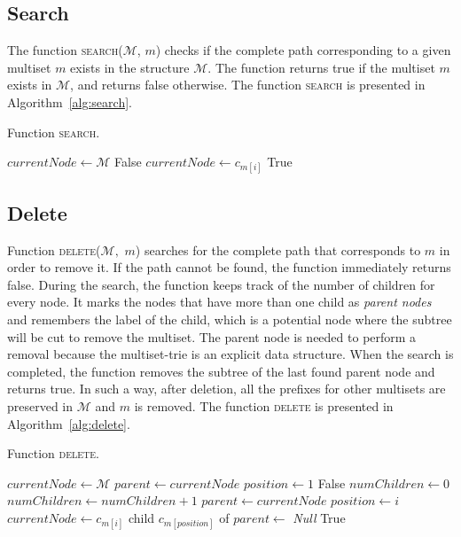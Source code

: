 \documentclass[algorithms,article,accept,pdftex,moreauthors]{Definitions/mdpi}
\begin{document}
\subsection{Search}\label{s:search}
The function \textsc{search}($\mathcal{M}$, $m$) checks if the complete path corresponding to 
a given multiset $m$ exists in the structure $\mathcal{M}.$ The function returns 
true if the multiset $m$ exists in $\mathcal{M}$, and returns false otherwise. The 
function \textsc{search} is presented in Algorithm~\ref{alg:search}.

\begin{algorithm}[H]
\caption{Function \textsc{search}.}
\label{alg:search}
\begin{algorithmic}[1]
\State $currentNode \gets \mathcal{M}$
\State \Return False
\EndIf
\State $currentNode \gets c_{m[i]}$
\EndFor
\State \Return True
\EndFunction
\end{algorithmic}
\end{algorithm}

\subsection{Delete} \label{s:delete}
Function \textsc{delete}($\mathcal{M},$ $m$) searches for the complete path 
that corresponds to $m$ in order to remove it. If the path cannot be found, the 
function immediately returns false. During the search, the function keeps track of the 
number of children for every node. It marks the nodes that have more than one child 
as \emph{parent nodes} and remembers the label of the child, which is a potential node 
where the subtree will be cut to remove the multiset. The parent node is needed to 
perform a removal because the multiset-trie is an explicit data structure. When the search 
is completed, the function removes the subtree of the last found parent node and 
returns true. In such a way, after deletion, all the prefixes for other multisets are 
preserved in $\mathcal{M}$ and $m$ is removed. The function \textsc{delete} is 
presented in Algorithm~\ref{alg:delete}.


\begin{algorithm}[H]
\caption{Function \textsc{delete}.}
\label{alg:delete}
\begin{algorithmic}[1]
\State $currentNode \gets \mathcal{M}$
\State $parent \gets currentNode$ 
\State $position \gets 1$
\State \Return False
\EndIf
\State $numChildren \gets 0$
\State $numChildren\gets numChildren+1$
\EndIf
\EndFor
{}
\State $parent\gets currentNode$
\State $position \gets i$
\EndIf
\State $currentNode \gets c_{m[i]}$
\EndFor
\State child $c_{m[position]}$ of $parent\gets$ \emph{Null}
\State \Return True
\EndFunction
\end{algorithmic}
\end{algorithm}
\end{document}
